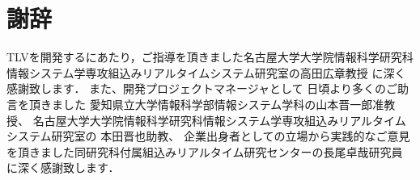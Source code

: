 \documentclass[final,12pt,report]{jsbook}
\begin{document}







\chapter*{謝辞}
TLVを開発するにあたり，ご指導を頂きました名古屋大学大学院情報科学研究科
情報システム学専攻組込みリアルタイムシステム研究室の高田広章教授
に深く感謝致します．
また、開発プロジェクトマネージャとして
日頃より多くのご助言を頂きました
愛知県立大学情報科学部情報システム学科の山本晋一郎准教授、
名古屋大学大学院情報科学研究科情報システム学専攻組込みリアルタイムシステム研究室の
本田晋也助教、
企業出身者としての立場から実践的なご意見を頂きました同研究科付属組込みリアルタイム研究センターの長尾卓哉研究員
に深く感謝致します．
\end{document}
